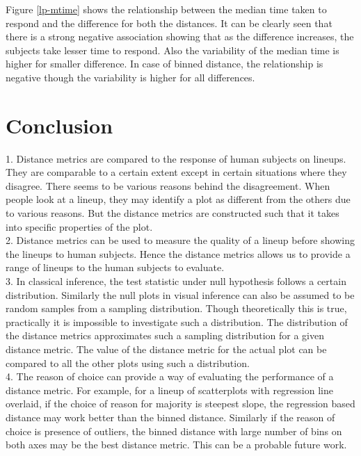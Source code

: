 \documentclass[12]{article}
\begin{document}
Figure \ref{lp-mtime} shows the relationship between the median time taken to respond and the difference for both the distances. It can be clearly seen that there is a strong negative association showing that as the difference increases, the subjects take lesser time to respond. Also the variability of the median time is higher for smaller difference. In case of binned distance, the relationship is negative though the variability is higher for all differences.


\section{Conclusion}

{\color{red} 1.  Distance metrics are compared to the response of human subjects on lineups. They are comparable to a certain extent except in certain situations where they disagree. There seems to be various reasons behind the disagreement. When people look at a lineup, they may identify a plot as different from the others due to various reasons. But the distance metrics are constructed such that it takes into specific properties of the plot. \\

2. Distance metrics can be used to measure the quality of a lineup before showing the lineups to human subjects. Hence the distance metrics allows us to provide a range of lineups to the human subjects to evaluate. \\

3.  In classical inference, the test statistic under null hypothesis follows a certain distribution. Similarly the null plots in visual inference can also be assumed to be random samples from a sampling distribution. Though theoretically this is true, practically it is impossible to investigate such a distribution. The distribution of the distance metrics approximates such a sampling distribution for a given distance metric. The value of the distance metric for the actual plot can be compared to all the other plots using such a distribution.\\

4. The reason of choice can provide a way of evaluating the performance of a distance metric. For example, for a lineup of scatterplots with regression line overlaid, if the choice of reason for majority is steepest slope, the regression based distance may work better than the binned distance. Similarly if the reason of choice is presence of outliers, the binned distance with large number of bins on both axes may be the best distance metric. This can be a probable future work.\\
 }
\end{document}
